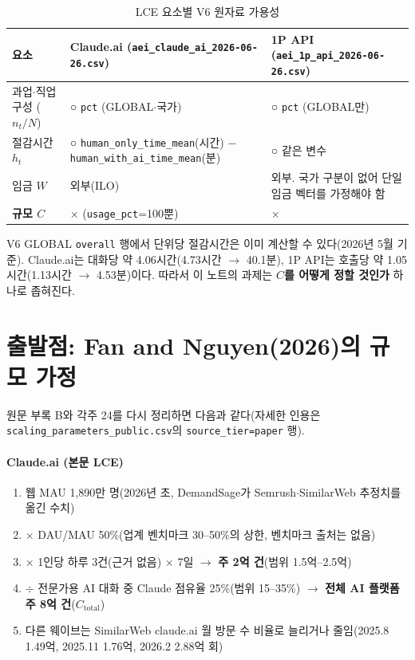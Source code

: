 \documentclass[11pt]{article}
\begin{document}
\begin{longtable}{L{3.4cm}L{5.6cm}L{5.6cm}}
\caption{LCE 요소별 V6 원자료 가용성}\label{tab:avail}\\
\toprule
요소 & Claude.ai (\texttt{aei\_claude\_ai\_2026-06-26.csv}) & 1P API (\texttt{aei\_1p\_api\_2026-06-26.csv}) \\
\midrule
\endhead
과업$\cdot$직업 구성 ($n_t/N$) & ○ \texttt{pct} (GLOBAL$\cdot$국가) & ○ \texttt{pct} (GLOBAL만) \\
절감시간 $h_t$ & ○ \texttt{human\_only\_time\_mean}(시간) $-$ \texttt{human\_with\_ai\_time\_mean}(분) & ○ 같은 변수 \\
임금 $W$ & 외부(ILO) & 외부. 국가 구분이 없어 단일 임금 벡터를 가정해야 함 \\
\textbf{규모 $C$} & × (\texttt{usage\_pct}=100뿐) & × \\
\bottomrule
\end{longtable}

V6 GLOBAL \texttt{overall} 행에서 단위당 절감시간은 이미 계산할 수 있다(2026년 5월 기준). Claude.ai는 대화당 약 4.06시간(4.73시간 $\to$ 40.1분), 1P API는 호출당 약 1.05시간(1.13시간 $\to$ 4.53분)이다. 따라서 이 노트의 과제는 \textbf{$C$를 어떻게 정할 것인가} 하나로 좁혀진다.

\section{출발점: Fan and Nguyen(2026)의 규모 가정}

원문 부록 B와 각주 24를 다시 정리하면 다음과 같다(자세한 인용은 \texttt{scaling\_parameters\_public.csv}의 \texttt{source\_tier=paper} 행).

\paragraph{Claude.ai (본문 LCE)}
\begin{enumerate}[label=(\arabic*)]
  \item 웹 MAU 1,890만 명(2026년 초, DemandSage가 Semrush$\cdot$SimilarWeb 추정치를 옮긴 수치)
  \item $\times$ DAU/MAU 50\%(업계 벤치마크 30--50\%의 상한, 벤치마크 출처는 없음)
  \item $\times$ 1인당 하루 3건(근거 없음) $\times$ 7일 $\to$ \textbf{주 2억 건}(범위 1.5억--2.5억)
  \item $\div$ 전문가용 AI 대화 중 Claude 점유율 25\%(범위 15--35\%) $\to$ \textbf{전체 AI 플랫폼 주 8억 건}($C_{\text{total}}$)
  \item 다른 웨이브는 SimilarWeb claude.ai 월 방문 수 비율로 늘리거나 줄임(2025.8 1.49억, 2025.11 1.76억, 2026.2 2.88억 회)
\end{enumerate}
\end{document}
